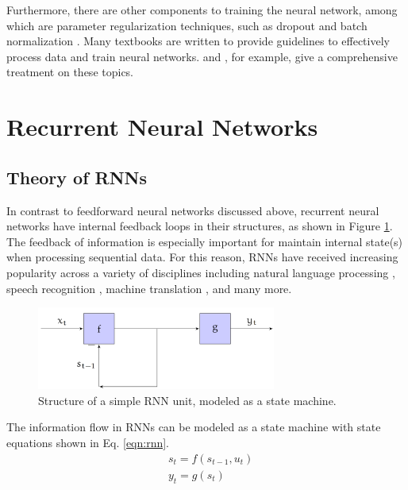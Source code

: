 Furthermore, there are other components to training the neural network, among which are parameter regularization techniques, such as dropout and batch normalization \cite{batch_norm}. Many textbooks are written to provide guidelines to effectively process data and train neural networks. \cite{dl_patterson} and \cite{ml_book_chollet}, for example, give a comprehensive treatment on these topics. 

\section{Recurrent Neural Networks}\label{ch:ml:rnn}

\subsection{Theory of RNNs} \label{ch:ml:rnn:theory}

In contrast to feedforward neural networks discussed above, recurrent neural networks \cite{rumelhart_backprop} have internal feedback loops in their structures, as shown in Figure \ref{fig:rnn}. The feedback of information is especially important for maintain internal state(s) when processing sequential data. For this reason, RNNs have received increasing popularity across a variety of disciplines including natural language processing \cite{rnn_nlp}, speech recognition \cite{rnn_speech_recog}, machine translation \cite{rnn_machine_trans}, and many more. 

\begin{figure}[t!]
    \centering
    \includegraphics[width=0.7\textwidth]{figures/rnn.png}
    \caption{Structure of a simple RNN unit, modeled as a state machine.}
    \label{fig:rnn}
\end{figure}

The information flow in RNNs can be modeled as a state machine with state equations shown in Eq. \ref{eqn:rnn}. 
\begin{equation}
    \label{eqn:rnn}
    \begin{split}
        & s_t = f(s_{t-1}, u_t) \\
        & y_t = g(s_t)
    \end{split}
\end{equation}

